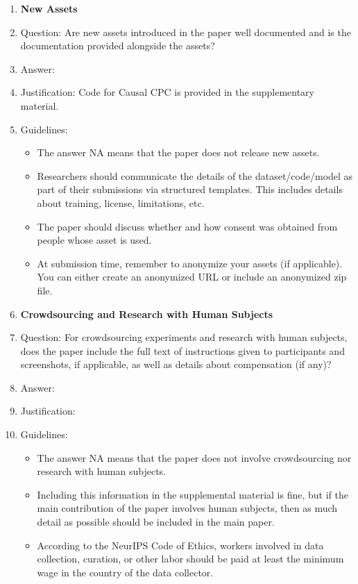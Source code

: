 \documentclass{article}
\theoremstyle{plain}
\theoremstyle{definition}
\theoremstyle{remark}
\begin{document}
\begin{enumerate}
\item {\bf New Assets}
    \item[] Question: Are new assets introduced in the paper well documented and is the documentation provided alongside the assets?
    \item[] Answer: \answerYes{} %
    \item[] Justification: Code for Causal CPC is provided in the supplementary material.
    \item[] Guidelines:
    \begin{itemize}
        \item The answer NA means that the paper does not release new assets.
        \item Researchers should communicate the details of the dataset/code/model as part of their submissions via structured templates. This includes details about training, license, limitations, etc. 
        \item The paper should discuss whether and how consent was obtained from people whose asset is used.
        \item At submission time, remember to anonymize your assets (if applicable). You can either create an anonymized URL or include an anonymized zip file.
    \end{itemize}

\item {\bf Crowdsourcing and Research with Human Subjects}
    \item[] Question: For crowdsourcing experiments and research with human subjects, does the paper include the full text of instructions given to participants and screenshots, if applicable, as well as details about compensation (if any)? 
    \item[] Answer: \answerNA{}{} %
    \item[] Justification:
    \item[] Guidelines:
    \begin{itemize}
        \item The answer NA means that the paper does not involve crowdsourcing nor research with human subjects.
        \item Including this information in the supplemental material is fine, but if the main contribution of the paper involves human subjects, then as much detail as possible should be included in the main paper. 
        \item According to the NeurIPS Code of Ethics, workers involved in data collection, curation, or other labor should be paid at least the minimum wage in the country of the data collector. 
    \end{itemize}


\end{enumerate}
\end{document}
